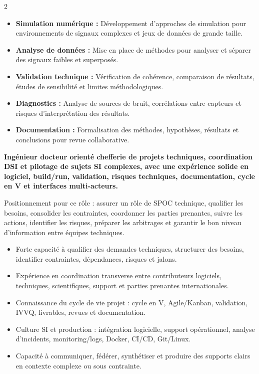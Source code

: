 \documentclass[8pt,a4paper,ragged2e,withhyper]{altacv}
\begin{document}
\begin{paracol}{2}
\begin{itemize}
  \item \textbf{Simulation numérique :} Développement d’approches de simulation pour environnements de signaux complexes et jeux de données de grande taille.
  \item \textbf{Analyse de données :} Mise en place de méthodes pour analyser et séparer des signaux faibles et superposés.
  \item \textbf{Validation technique :} Vérification de cohérence, comparaison de résultats, études de sensibilité et limites méthodologiques.
  \item \textbf{Diagnostics :} Analyse de sources de bruit, corrélations entre capteurs et risques d’interprétation des résultats.
  \item \textbf{Documentation :} Formalisation des méthodes, hypothèses, résultats et conclusions pour revue collaborative.
\end{itemize}

\switchcolumn


\textbf{Ingénieur docteur orienté chefferie de projets techniques, coordination DSI et pilotage de sujets SI complexes, avec une expérience solide en logiciel, build/run, validation, risques techniques, documentation, cycle en V et interfaces multi-acteurs.}

Positionnement pour ce rôle : assurer un rôle de SPOC technique, qualifier les besoins, consolider les contraintes, coordonner les parties prenantes, suivre les actions, identifier les risques, préparer les arbitrages et garantir le bon niveau d’information entre équipes techniques.

\begin{itemize}
  \item Forte capacité à qualifier des demandes techniques, structurer des besoins, identifier contraintes, dépendances, risques et jalons.
  \item Expérience en coordination transverse entre contributeurs logiciels, techniques, scientifiques, support et parties prenantes internationales.
  \item Connaissance du cycle de vie projet : cycle en V, Agile/Kanban, validation, IVVQ, livrables, revues et documentation.
  \item Culture SI et production : intégration logicielle, support opérationnel, analyse d’incidents, monitoring/logs, Docker, CI/CD, Git/Linux.
  \item Capacité à communiquer, fédérer, synthétiser et produire des supports clairs en contexte complexe ou sous contrainte.
\end{itemize}


\end{paracol}
\end{document}
